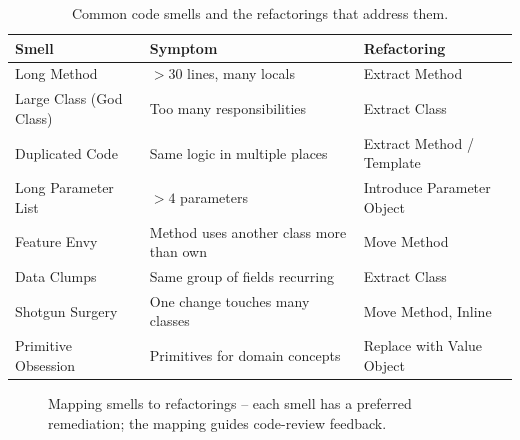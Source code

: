 \begin{table}[h]
\centering\small
\begin{tabular}{@{}lp{5.8cm}l@{}}
\toprule
Smell & Symptom & Refactoring \\ \midrule
Long Method & $>30$ lines, many locals & Extract Method \\
Large Class (God Class) & Too many responsibilities & Extract Class \\
Duplicated Code & Same logic in multiple places & Extract Method / Template \\
Long Parameter List & $>4$ parameters & Introduce Parameter Object \\
Feature Envy & Method uses another class more than own & Move Method \\
Data Clumps & Same group of fields recurring & Extract Class \\
Shotgun Surgery & One change touches many classes & Move Method, Inline \\
Primitive Obsession & Primitives for domain concepts & Replace with Value Object \\
\bottomrule
\end{tabular}
\caption{Common code smells and the refactorings that address them.}
\end{table}

\begin{figure}[h]
\centering
{}
\caption{Mapping smells to refactorings -- each smell has a preferred remediation; the mapping guides code-review feedback.}
\end{figure}

